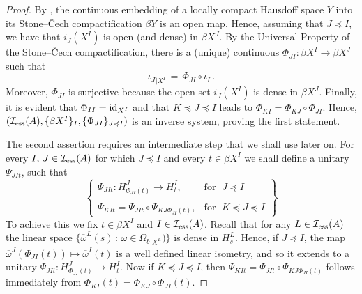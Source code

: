 \documentclass{amsart}
\theoremstyle{definition}
\theoremstyle{remark}
\begin{document}
\begin{proof} By \cite[Theorem VII.7.3]{Dugundji-book}, the continuous embedding of a locally compact Hausdoff space $Y$ into its Stone--\v Cech
compactification $\beta Y$ is an open map. Hence, assuming that $J \preccurlyeq I$, we have that
$i_J(X^I)$ is open (and dense) in $\beta X^J$.
By the Universal Property of the Stone--\v Cech compactification, there is a (unique)
continuous $\Phi_{JI}:\beta X^I\rightarrow \beta X^J$ such that
\begin{equation}\label{used a lot}
\iota_J{}_{|X^I}\,=\,\Phi_{JI}\circ \iota_I\,.
\end{equation}
Moreover, $\Phi_{JI}$ is surjective
because the open set $i_J(X^I)$ is dense in $\beta X^J$.
Finally, it is evident that $\Phi_{II}={\rm id}_{X^I}$ and that $K \preccurlyeq J \preccurlyeq I$
leads to
$\Phi_{KI}=\Phi_{KJ}\circ\Phi_{JI}$. Hence, $( \mathcal I_{\rm ess}(A), \{\beta X^I\}_I, \{\Phi_{JI}\}_{J\preccurlyeq I})$ is an inverse system,
proving the first statement.

The second assertion requires an intermediate step that we shall use later on.
For every  $I,\,J\in  \mathcal I_{\rm ess}(A)$
for which  $J \preccurlyeq I$ and every $t\in \beta X^I$ we shall define a
unitary $\Psi_{JIt}$, such that
\begin{equation}\label{e:hs iso}
\left\{ \begin{array} {ll}
\Psi_{JIt}:H^J_{\Phi_{JI}(t)}\rightarrow H^I_t, & \mbox{for }\;  J \preccurlyeq I \\  & \\
\Psi_{KIt}=\Psi_{JIt}\circ\Psi_{KJ\Phi_{JI}(t)}, & \mbox{for }\; K \preccurlyeq J \preccurlyeq I
\end{array}
\right\}
\end{equation}
To achieve this we fix $t\in\beta X^I$ and $I\in  \mathcal I_{\rm ess}(A)$. Recall that for any $L\in \mathcal I_{\rm ess}(A)$ the
linear space $\{\overline\omega^L(s)\,:\,\omega\in \Omega_b{}_{|X^L})\}$ is dense in $H^L_s$.
Hence, if  $J \preccurlyeq I$,  the map $\overline\omega^J\left(\Phi_{JI}(t)\right)\mapsto \overline\omega^I(t)$
is a well defined linear isometry, and so it extends to a unitary
$\Psi_{JIt}:H^J_{\Phi_{JI}(t)}\rightarrow H^I_t$. Now if $K \preccurlyeq J \preccurlyeq I$, then $\Psi_{KIt}=\Psi_{JIt}\circ\Psi_{KJ\Phi_{JI}(t)}$
follows immediately from $\Phi_{KI}(t)=\Phi_{KJ}\circ\Phi_{JI}(t)$.


\end{proof}
\end{document}
